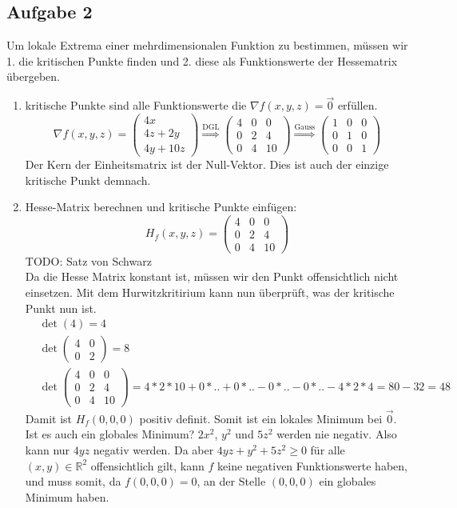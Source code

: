 \documentclass[10pt,a4paper,parskip=half]{scrartcl}
\begin{document}
\subsection*{Aufgabe 2}
Um lokale Extrema einer mehrdimensionalen Funktion zu bestimmen, müssen wir 1. die kritischen Punkte finden und 2. diese als Funktionswerte der Hessematrix übergeben.
\begin{enumerate}
	\item kritische Punkte sind alle Funktionswerte die $\nabla f(x,y,z) = \vec0$ erfüllen.
	\[\nabla f(x,y,z) = 
	\begin{pmatrix}
		4x \\ 
		4z + 2y \\
		4y + 10z	
	\end{pmatrix} \overset{\text{DGL}}{\Rightarrow}
	\begin{pmatrix}
		4 & 0 & 0 \\
		0 & 2 & 4 \\
		0 & 4 & 10 
	\end{pmatrix} \overset{\text{Gauss}}{\Rightarrow}
	\begin{pmatrix}
		1 & 0 & 0 \\
		0 & 1 & 0 \\
		0 & 0 & 1
	\end{pmatrix}\]
	Der Kern der Einheitsmatrix ist der Null-Vektor. Dies ist auch der einzige kritische Punkt demnach.
	\item Hesse-Matrix berechnen und kritische Punkte einfügen:
	\[H_f(x,y,z) =
	\begin{pmatrix}
		4 & 0 & 0 \\
		0 & 2 & 4 \\
		0 & 4 & 10
	\end{pmatrix}
	\] 
	TODO: Satz von Schwarz\\
	Da die Hesse Matrix konstant ist, müssen wir den Punkt offensichtlich nicht einsetzen. Mit dem Hurwitzkritirium kann nun überprüft, was der kritische Punkt nun ist. 
	\begin{align*}
	 	&\det(4) = 4 \\
	 	&\det \begin{pmatrix}
	 		4 & 0 \\
	 		0 & 2	
	 	\end{pmatrix} = 8 \\
	 	&\det \begin{pmatrix}
	 		4 & 0 & 0 \\
			0 & 2 & 4 \\
			0 & 4 & 10
	 	\end{pmatrix} = 4*2*10 + 0*.. + 0*.. - 0 * .. - 0 *.. - 4 * 2 * 4 = 80 - 32 = 48 
	 \end{align*} Damit ist $H_f(0,0,0)$ positiv definit. Somit ist ein lokales Minimum bei $\vec 0$. Ist es auch ein globales Minimum? 
	$2x^2$, $y^2$ und $5z^2$ werden nie negativ. Also kann nur $4yz$ negativ werden. Da aber $4yz  + y^2 + 5z^2 \ge 0$ für alle $(x,y) \in \mathbb{R}^2$ offensichtlich gilt, kann $f$ keine negativen Funktionswerte haben,  und muss somit, da $f(0,0,0) = 0$, an der Stelle $(0,0,0)$ ein globales Minimum haben.


\end{enumerate}
\end{document}
